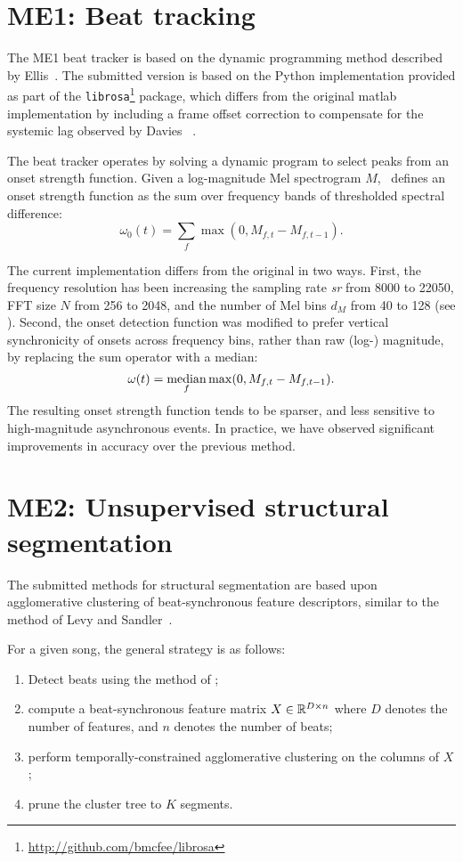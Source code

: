 \documentclass{article}
\begin{document}
\section{ME1: Beat tracking}

The ME1 beat tracker is based on the dynamic programming method described by Ellis~\cite{ellis2007beat}.
The submitted version is based on the Python implementation provided as part of the {\tt librosa}\footnote{\url{http://github.com/bmcfee/librosa}} package, 
which differs from the original matlab implementation by including a frame offset
correction to compensate for the systemic lag observed by Davies \etal~\cite{davies2009evaluation}.

The beat tracker operates by solving a dynamic program to select peaks from an onset strength function.  
Given a log-magnitude Mel spectrogram $M$,~\cite{ellis2007beat} defines an onset strength function as the sum over
frequency bands of thresholded spectral difference:
\[
\omega_0(t) = \sum_f \max(0, M_{f, t} - M_{f, t-1}).
\]

The current implementation differs from the original in two ways.  First, the frequency resolution has been
increasing the sampling rate {\em sr} from 8000 to 22050, FFT size $N$ from 256 to 2048, and the number of Mel bins
$d_M$ from 40 to 128 (see ).  Second, the onset detection function was modified to prefer
vertical synchronicity of onsets across frequency bins, rather than raw (log-) magnitude, by replacing the sum operator
with a median:
\[
\omega(t) = \operatorname*{median}_f \max(0, M_{f,t} - M_{f, t-1}).
\]
The resulting onset strength function tends to be sparser, and less sensitive to high-magnitude asynchronous
events.  In practice, we have observed significant improvements in accuracy over the previous method.

\label{sec:beats}

\section{ME2: Unsupervised structural segmentation}

The submitted methods for structural segmentation are based upon agglomerative clustering of beat-synchronous
feature descriptors, similar to the method of Levy and Sandler~\cite{levy2008structural}.

For a given song, the general strategy is as follows:
\begin{enumerate}
\item Detect beats using the method of ;
\item compute a beat-synchronous feature matrix $X \in \mathbb{R}^{D\times n}$ where $D$ denotes the number of features,
and $n$ denotes the number of beats;
\item perform temporally-constrained agglomerative clustering on the columns of $X$;
\item prune the cluster tree to $K$ segments.
\end{enumerate}
\end{document}
